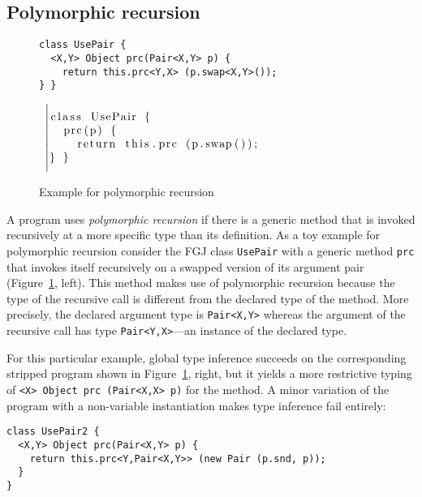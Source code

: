 
\subsection{Polymorphic recursion}
\label{sec:polym-recurs}
\begin{figure}[tp]
  \begin{minipage}{0.49\linewidth}
\begin{lstlisting}
class UsePair {
  <X,Y> Object prc(Pair<X,Y> p) {
    return this.prc<Y,X> (p.swap<X,Y>());
} }
\end{lstlisting}
  \end{minipage}
  ~$\left|
  \begin{minipage}{0.49\linewidth}
\begin{lstlisting}
class UsePair {
  prc(p) {
    return this.prc (p.swap());

} }
\end{lstlisting}
  \end{minipage}\right.$
  \caption{Example for polymorphic recursion}
  \label{fig:examples-poly-rec}
\end{figure}
A program uses \emph{polymorphic recursion} if there is a generic method that is invoked
recursively at a more specific type than its definition.
As a toy example for polymorphic recursion consider the FGJ class \texttt{UsePair} with a
generic method \texttt{prc} that invokes itself
recursively on a swapped version of its argument pair
(Figure~\ref{fig:examples-poly-rec}, left).
This method makes use of polymorphic recursion because the type of the
recursive call is different from the declared type of the method. More
precisely, the declared argument type is \texttt{Pair<X,Y>} whereas
the argument of the recursive call has type
\texttt{Pair<Y,X>}---an instance of the declared type.

For this particular example, global type inference succeeds on the
corresponding stripped program shown in
Figure~\ref{fig:examples-poly-rec}, right, but it yields a more restrictive
typing of \texttt{<X> Object prc (Pair<X,X> p)} for the method. 
A minor variation of the program with a non-variable instantiation makes type inference fail entirely:
\begin{lstlisting}
class UsePair2 {
  <X,Y> Object prc(Pair<X,Y> p) {
    return this.prc<Y,Pair<X,Y>> (new Pair (p.snd, p));
  }
}
\end{lstlisting}



